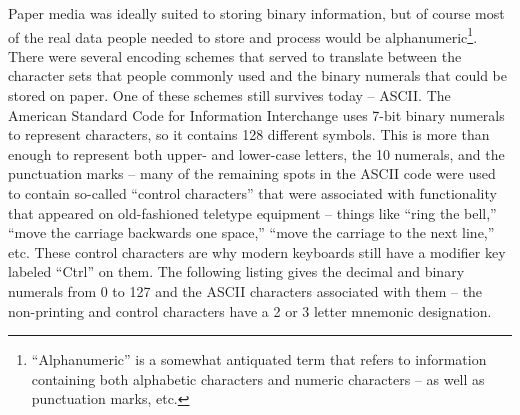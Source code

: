 Paper media was ideally suited to storing binary information, but of course
most of the real data people needed to store and process would be 
alphanumeric\footnote{``Alphanumeric'' is a somewhat
antiquated term that refers to information containing both alphabetic 
characters and numeric characters -- as well as punctuation marks, etc.}.
There were several encoding schemes that served to translate between the
character sets that people commonly used and the binary numerals that could
be stored on paper.  One of these schemes still survives today -- 
ASCII.
The American Standard Code for Information Interchange uses 7-bit binary
numerals to represent characters, so it contains 128 different symbols.
This is more than enough to represent both upper- and lower-case 
letters, the 10 numerals, and the punctuation marks -- many of the 
remaining spots in the ASCII code were used to contain so-called 
``control characters'' that were associated with functionality that
appeared on old-fashioned teletype equipment -- things like ``ring the bell,''
``move the carriage backwards one space,''  ``move the carriage 
to the next line,'' etc.   These control characters are why modern 
keyboards still have a modifier key labeled ``Ctrl'' on them.  The 
following listing gives the decimal and binary numerals from 0 to 127
and the ASCII characters associated with them -- the non-printing and
control characters have a 2 or 3 letter mnemonic designation.    
 
\renewcommand{\baselinestretch}{.9}
\renewcommand{\arraystretch}{.9}


\small \normalsize %

